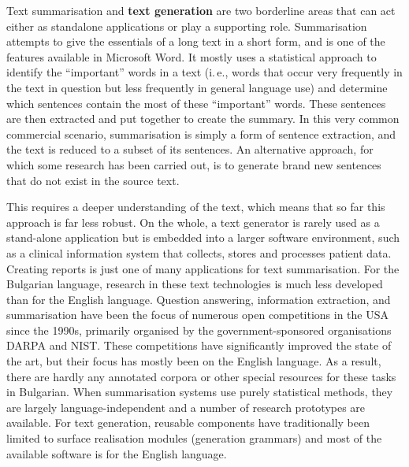 \documentclass[]{../../metanetpaper}
\begin{document}
\begin{multicols}{2}

Text summarisation and \textbf{text generation} are two borderline areas that can act either as standalone applications or play a supporting role. Summarisation attempts to give the essentials of a long text in a short form, and is one of the features available in Microsoft Word. It mostly uses a statistical approach to identify the “important” words in a text (i.\,e., words that occur very frequently in the text in question but less frequently in general language use) and determine which sentences contain the most of these “important” words. These sentences are then extracted and put together to create the summary. In this very common commercial scenario, summarisation is simply a form of sentence extraction, and the text is reduced to a subset of its sentences. An alternative approach, for which some research has been carried out, is to generate brand new sentences that do not exist in the source text.


This requires a deeper understanding of the text, which means that so far this approach is far less robust. On the whole, a text generator is rarely used as a stand-alone application but is embedded into a larger software environment, such as a clinical information system that collects, stores and processes patient data. Creating reports is just one of many applications for text summarisation. 
For the Bulgarian language, research in these text technologies is much less developed than for the English language. Question answering, information extraction, and summarisation have been the focus of numerous open competitions in the USA since the 1990s, primarily organised by the government-sponsored organisations DARPA and NIST. These competitions have significantly improved the state of the art, but their focus has mostly been on the English language. As a result, there are hardly any annotated corpora or other special resources for these tasks in Bulgarian. When summarisation systems use purely statistical methods, they are largely language-independent and a number of research prototypes are available. For text generation, reusable components have traditionally been limited to surface realisation modules (generation grammars) and most of the available software is for the English language. 


\end{multicols}
\end{document}
